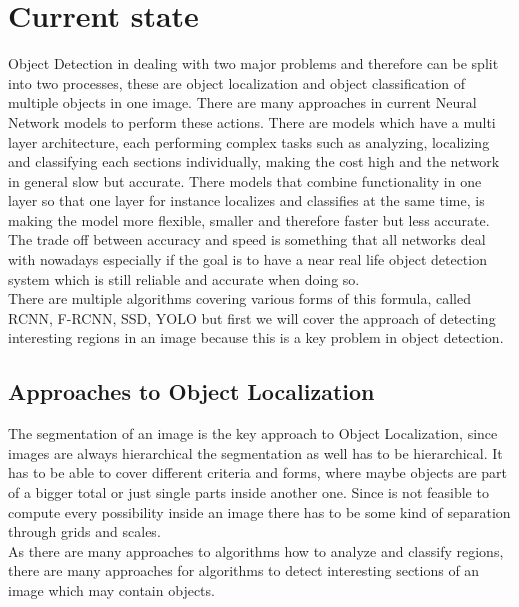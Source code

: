 \section{Current state}
Object Detection in dealing with two major problems and therefore can be split into two processes, these are object localization and object
classification of multiple objects in one image. There are many approaches in current Neural Network models to perform these actions.
There are models which have a multi layer architecture, each performing complex tasks such as analyzing, localizing and classifying each
sections individually, making the cost high and the network in general slow but accurate.
There models that combine functionality in one layer so that one layer for instance localizes and classifies at the same time, is making the
model more flexible, smaller and therefore faster but less accurate.
The trade off between accuracy and speed is something that all networks deal with nowadays especially if the goal is to have a near real life object
detection system which is still reliable and accurate when doing so. \\
There are multiple algorithms covering various forms of this formula, called RCNN, F-RCNN, SSD, YOLO but first we will cover the approach of
detecting interesting regions in an image because this is a key problem in object detection.

\subsection{Approaches to Object Localization}
The segmentation of an image is the key approach to Object Localization, since images are always hierarchical the segmentation as well has
to be hierarchical. It has to be able to cover different criteria and forms, where maybe objects are part of a bigger total or just single
parts inside another one. Since is not feasible to compute every possibility inside an image there has to be some kind of separation
through grids and scales. \\
As there are many approaches to algorithms how to analyze and classify regions, there are many approaches for algorithms to detect
interesting sections of an image which may contain objects.

